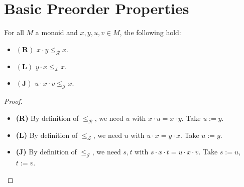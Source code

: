 \section{Basic Preorder Properties}

\begin{lemma}
\label{lem:mul-decreases-all}
For all \(M\) a monoid and \(x,y,u,v\in M\), the following hold:
\begin{itemize}
  \item \(\mathbf{(R)}\) \(x\cdot y \le_{\mathcal R} x\).
  \item \(\mathbf{(L)}\) \(y\cdot x \le_{\mathcal L} x\).
  \item \(\mathbf{(J)}\) \(u\cdot x\cdot v \le_{\mathcal J} x\).
\end{itemize}
\leanok
{}
\end{lemma}
\begin{proof}
\leanok
\begin{itemize}
  \item \textbf{(R)} By definition of \(\le_{\mathcal R}\), we need \(u\) with \(x\cdot u = x\cdot y\). Take \(u:=y\).
  \item \textbf{(L)} By definition of \(\le_{\mathcal L}\), we need \(u\) with \(u\cdot x = y\cdot x\). Take \(u:=y\).
  \item \textbf{(J)} By definition of \(\le_{\mathcal J}\), we need \(s,t\) with \(s\cdot x\cdot t = u\cdot x\cdot v\). Take \(s:=u\), \(t:=v\).
\end{itemize}
\end{proof}

